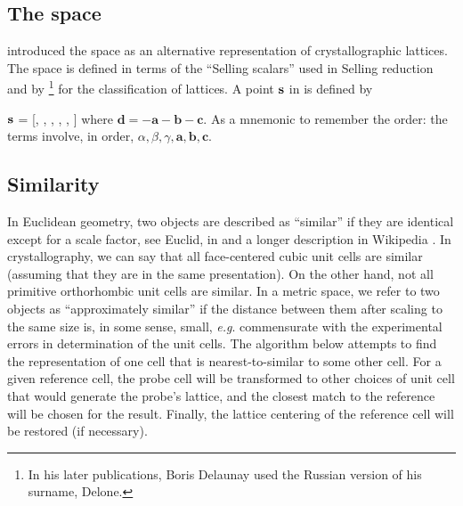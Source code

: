 \documentclass[preprint]{iucr}              %
\numberwithin{equation}{section}
\numberwithin{equation}{section}
\begin{document}
	\subsection{The space \SVI{}}
	 introduced the space \SVI{} as an alternative
	representation of crystallographic lattices. The space is defined in terms of the
	``Selling scalars'' used in Selling reduction \cite{Selling1874} and by %
		\footnote{In his later publications, Boris Delaunay used the Russian version of his surname, Delone.}
	for the classification of lattices. A point $\bf{s}$ in \SVI{} is defined by 
	
	$\bf{s}$  = [, , , , , ]
	where
	${\mathbf d} = -{\mathbf a} - {\mathbf b} - {\mathbf c}$.
	As a mnemonic to remember the order: the terms involve, in order, $ \alpha, \beta,
	\gamma, \mathbf{a}, \mathbf{b}, \mathbf{c}$.
	
	
	\subsection{Similarity}
	
In Euclidean geometry, two objects are described as ``similar'' if they are identical except for a scale factor, see Euclid, in \cite{heath1956thirteen} and a longer description in Wikipedia  \cite{enwiki:1097100366}.
	In crystallography, we can say that all face-centered cubic unit cells are similar (assuming
	that they are in the same presentation). On the other hand, not all primitive orthorhombic 
	unit cells are similar.  In a metric space, we
	refer to two objects as ``approximately similar'' if the distance between them after scaling
	to the same size is, in some sense, small, {\it e.g}. commensurate with the experimental errors
	in determination of the unit cells.  The algorithm below attempts to find the representation of one 
	cell that is nearest-to-similar to some other cell. For a given reference cell, the probe cell
	will be transformed to other choices of unit cell that would generate the probe's lattice, and the
	closest match to the reference will be chosen for the result. Finally, the lattice centering
	of the reference cell will be restored (if necessary).
	
\end{document}
